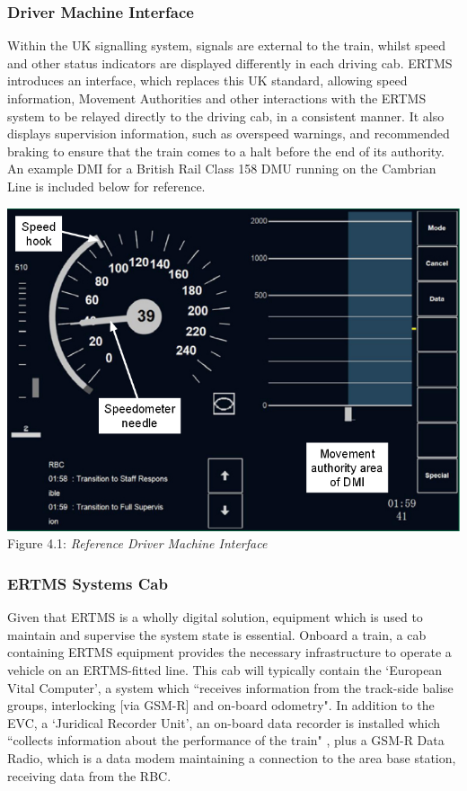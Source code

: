 \documentclass[twoside,11pt,a4paper]{article}
\begin{document}
\subsubsection{Driver Machine Interface}
Within the UK signalling system, signals are external to the train, whilst speed and other status indicators are displayed differently in each driving cab. ERTMS introduces an interface, which replaces this UK standard, allowing speed information, Movement Authorities and other interactions with the ERTMS system to be relayed directly to the driving cab, in a consistent manner. It also displays supervision information, such as overspeed warnings, and recommended braking to ensure that the train comes to a halt before the end of its authority. An example DMI for a British Rail Class 158 DMU running on the Cambrian Line is included below for reference.

\begin{center}
 \includegraphics[scale=.25]{DMI.jpg}\\
Figure 4.1: \textit{Reference Driver Machine Interface \citep[p. 24]{RAIB12a}}
\end{center}

\subsubsection{ERTMS Systems Cab}
Given that ERTMS is a wholly digital solution, equipment which is used to maintain and supervise the system state is essential. Onboard a train, a cab containing ERTMS equipment provides the necessary infrastructure to operate a vehicle on an ERTMS-fitted line. This cab will typically contain the `European Vital Computer', a system which ``receives information from the track-side balise groups, interlocking [via GSM-R] and on-board odometry"\citep[p. 7]{NetworkRail15a}. In addition to the EVC, a `Juridical Recorder Unit', an on-board data recorder is installed which ``collects information about the performance of the train" \citep[p. 49]{RAIB12a}, plus a GSM-R Data Radio, which is a data modem maintaining a connection to the area base station, receiving data from the RBC.
\end{document}
